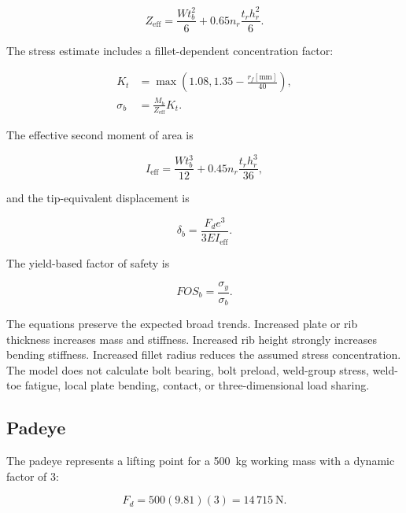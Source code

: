\begin{equation}
Z_{\mathrm{eff}}=
\frac{Wt_b^2}{6}
+0.65n_r\frac{t_rh_r^2}{6}.
\label{eq:bracket-section-modulus}
\end{equation}

The stress estimate includes a fillet-dependent concentration factor:

\begin{align}
K_t&=\max\left(1.08,1.35-\frac{r_f[\mathrm{mm}]}{40}\right),
\label{eq:bracket-kt}\\
\sigma_b&=\frac{M_b}{Z_{\mathrm{eff}}}K_t.
\label{eq:bracket-stress}
\end{align}

The effective second moment of area is

\begin{equation}
I_{\mathrm{eff}}=
\frac{Wt_b^3}{12}
+0.45n_r\frac{t_rh_r^3}{36},
\label{eq:bracket-inertia}
\end{equation}

and the tip-equivalent displacement is

\begin{equation}
\delta_b=\frac{F_de^3}{3EI_{\mathrm{eff}}}.
\label{eq:bracket-displacement}
\end{equation}

The yield-based factor of safety is

\begin{equation}
FOS_b=\frac{\sigma_y}{\sigma_b}.
\label{eq:bracket-fos}
\end{equation}

The equations preserve the expected broad trends. Increased plate or rib
thickness increases mass and stiffness. Increased rib height strongly
increases bending stiffness. Increased fillet radius reduces the assumed
stress concentration. The model does not calculate bolt bearing, bolt
preload, weld-group stress, weld-toe fatigue, local plate bending, contact, or
three-dimensional load sharing.

\subsection{Padeye}
\label{sec:padeye-definition}

The padeye represents a lifting point for a 500~kg working mass with a dynamic
factor of 3:

\begin{equation}
F_d=500(9.81)(3)=14\,715~\mathrm{N}.
\label{eq:padeye-load}
\end{equation}

